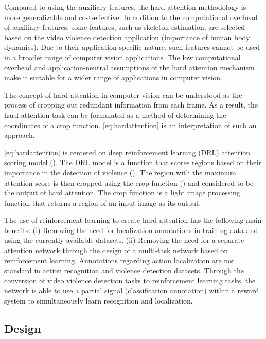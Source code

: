\documentclass[review]{elsarticle}
\begin{document}
{Compared to using the auxiliary features, the hard-attention methodology is more generalizable and cost-effective. In addition to the computational overhead of auxiliary features, some features, such as skeleton estimation, are selected based on the video violence detection application (importance of human body dynamics). Due to their application-specific nature, such features cannot be used in a broader range of computer vision applications. The low computational overhead and application-neutral assumptions of the hard attention mechanism make it suitable for a wider range of applications in computer vision.}

The concept of hard attention in computer vision can be understood as the process of cropping out redundant information from each frame. As a result, the hard attention task can be formulated as a method of determining the coordinates of a crop function. \autoref{eq:hardattention} is an interpretation of such an approach.



\autoref{eq:hardattention} {is centered on deep reinforcement learning (DRL) attention scoring model (). The DRL model is a function that scores regions based on their importance in the detection of violence (). The region with the maximum attention score is then cropped using the crop function () and considered to be the output of hard attention. The crop function is a light image processing function that returns a region of an input image as its output.}

The use of reinforcement learning to create hard attention has the following main benefits: (i) Removing the need for localization annotations in training data and using the currently available datasets. (ii) Removing the need for a separate attention network through the design of a multi-task network based on reinforcement learning. Annotations regarding action localization are not standard in action recognition and violence detection datasets. Through the conversion of video violence detection tasks to reinforcement learning tasks, the network is able to use a partial signal (classification annotation) within a reward system to simultaneously learn recognition and localization.



\subsection{Design}
\label{3:2}
\end{document}
